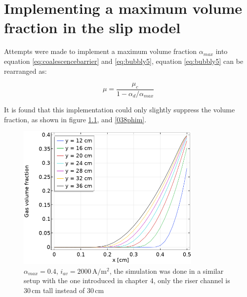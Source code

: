 \chapter{Implementing a maximum volume fraction in the slip model}\label{appendixc}

Attempts were made to implement a maximum volume fraction $\alpha_{max}$ into equation \ref{eq:coalescencebarrier} and \ref{eq:bubbly5}, equation \ref{eq:bubbly5} can be rearranged as:

\begin{equation}
    \mu = \frac{\mu_c}{1-\alpha_d/\alpha_{max}}
\end{equation}

It is found that this implementation could only slightly suppress the volume fraction, as shown in figure \ref{04phim}, and \ref{038phim}.


\begin{figure}[H]
    \centering
    \includegraphics[width=0.8\textwidth]{maxphi042000A.png}
    \caption{$\alpha_{max}=0.4$, $i_{av}=2000 \, \mathrm{A/m^2}$, the simulation was done in a similar setup with the one introduced in chapter 4, only the riser channel is $30 \, \mathrm{cm}$ tall instead of $30 \, \mathrm{cm}$}
    \label{04phim}
\end{figure}

